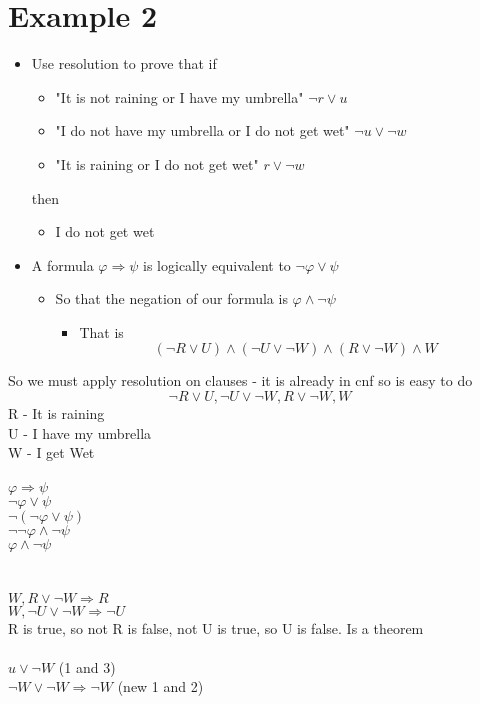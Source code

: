 \documentclass{article}[18pt]
\begin{document}
\section{Example 2}
\begin{itemize}
	\item Use resolution to prove that if
	\begin{itemize}
		\item "It is not raining or I have my umbrella" $\lnot r \lor u$
		\item "I do not have my umbrella or I do not get wet" $\lnot u \lor \lnot w$
		\item "It is raining or I do not get wet" $r \lor \lnot w$
	\end{itemize}
	then
	\begin{itemize}
		\item I do not get wet
	\end{itemize}
	\item A formula $\varphi\Rightarrow\psi$ is logically equivalent to $\lnot\varphi\lor\psi$
	\begin{itemize}
		\item So that the negation of our formula is $\varphi\land\lnot\psi$
		\begin{itemize}
			\item That is
			$$(\lnot R\lor U)\land(\lnot U\lor \lnot W)\land (R\lor\lnot W)\land W$$
		\end{itemize}
	\end{itemize}
\end{itemize}
So we must apply resolution on clauses - it is already in cnf so is easy to do
$$\lnot R\lor U, \lnot U\lor \lnot W,R\lor\lnot W, W$$
$ $\\
R - It is raining\\
U - I have my umbrella\\
W - I get Wet\\
\\
$\varphi \Rightarrow \psi$\\
$\lnot \varphi \lor \psi$\\
$\lnot(\lnot \varphi \lor \psi)$\\
$\lnot\lnot \varphi \land \lnot \psi$\\
$\varphi \land \lnot \psi$\\
\\
\\
$W, R\lor\lnot W \Rightarrow R$\\
$W, \lnot U\lor \lnot W \Rightarrow \lnot U$\\
R is true, so not R is false, not U is true, so U is false. Is a theorem\\
\\
$u\lor \lnot W$ (1 and 3)\\
$\lnot W \lor \lnot W \Rightarrow \lnot W$ (new 1 and 2) 
\end{document}
